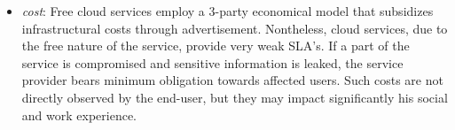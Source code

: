\begin{itemize}
\item {\it cost}: Free cloud services employ a 3-party economical model that
      subsidizes infrastructural costs through advertisement. Nontheless, 
      cloud services, due to the free nature of the service, provide very weak SLA's. If
      a part of the service is compromised and sensitive information is leaked,
      the service provider bears minimum obligation towards affected users. Such
      costs are not directly observed by the end-user, but they may impact
      significantly his social and work experience. 


\end{itemize}
